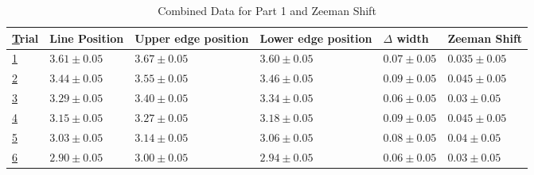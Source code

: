 \def\lineUncertainty{0.05}
\begin{table}[]
    \begin{adjustwidth}{-100pt}{-100pt}
        \centering
        \begin{tabular}{|l|l|l|l|l|l|}
            \hline
            {\ul Trial} & Line Position               & Upper edge position         & Lower edge position         & $\Delta$ width              & Zeeman Shift                 \\ \hline
            {\ul 1}     & $3.61 \pm \lineUncertainty$ & $3.67 \pm \lineUncertainty$ & $3.60 \pm \lineUncertainty$ & $0.07 \pm \lineUncertainty$ & $0.035 \pm \lineUncertainty$ \\ \hline
            {\ul 2}     & $3.44 \pm \lineUncertainty$ & $3.55 \pm \lineUncertainty$ & $3.46 \pm \lineUncertainty$ & $0.09 \pm \lineUncertainty$ & $0.045 \pm \lineUncertainty$ \\ \hline
            {\ul 3}     & $3.29 \pm \lineUncertainty$ & $3.40 \pm \lineUncertainty$ & $3.34 \pm \lineUncertainty$ & $0.06 \pm \lineUncertainty$ & $0.03 \pm \lineUncertainty$  \\ \hline
            {\ul 4}     & $3.15 \pm \lineUncertainty$ & $3.27 \pm \lineUncertainty$ & $3.18 \pm \lineUncertainty$ & $0.09 \pm \lineUncertainty$ & $0.045 \pm \lineUncertainty$ \\ \hline
            {\ul 5}     & $3.03 \pm \lineUncertainty$ & $3.14 \pm \lineUncertainty$ & $3.06 \pm \lineUncertainty$ & $0.08 \pm \lineUncertainty$ & $0.04 \pm \lineUncertainty$  \\ \hline
            {\ul 6}     & $2.90 \pm \lineUncertainty$ & $3.00 \pm \lineUncertainty$ & $2.94 \pm \lineUncertainty$ & $0.06 \pm \lineUncertainty$ & $0.03 \pm \lineUncertainty$  \\ \hline
        \end{tabular}
    \end{adjustwidth}
    \caption{Combined Data for Part 1 and Zeeman Shift}
\end{table}


